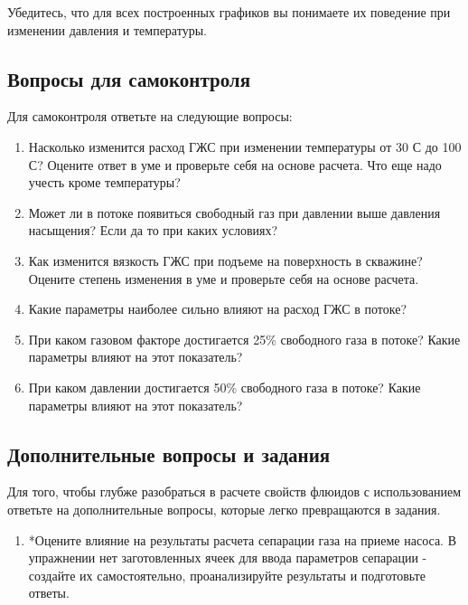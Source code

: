 Убедитесь, что для всех построенных графиков вы понимаете их поведение при изменении давления и температуры. 

\subsection{Вопросы для самоконтроля}
Для самоконтроля ответьте на следующие вопросы:

\begin{enumerate}
	
	\item Насколько изменится расход ГЖС при изменении температуры от 30 \textdegree С до 100 \textdegree С? Оцените ответ в уме и проверьте себя на основе расчета. Что еще надо учесть кроме температуры?
	
	\item Может ли в потоке появиться свободный газ при давлении выше давления насыщения? Если да то при каких условиях?
	
	\item Как изменится вязкость ГЖС при подъеме на поверхность в скважине? Оцените степень изменения в уме и проверьте себя на основе расчета.
	
	\item Какие параметры наиболее сильно влияют на расход ГЖС в потоке?
	
	\item При каком газовом факторе достигается 25\% свободного газа в потоке? Какие параметры влияют на этот показатель?
	 	
	\item При каком давлении достигается 50\% свободного газа в потоке? Какие параметры влияют на этот показатель?
	 	
\end{enumerate}

\subsection{Дополнительные вопросы и задания}

Для того, чтобы глубже разобраться в расчете свойств флюидов с использованием \unf{} ответьте на дополнительные вопросы, которые легко превращаются в задания.

\begin{enumerate}
	
	\item *Оцените влияние на результаты расчета сепарации газа на приеме насоса. В упражнении нет заготовленных ячеек для ввода параметров сепарации - создайте их самостоятельно, проанализируйте результаты и подготовьте ответы.
	
	
	
\end{enumerate}


